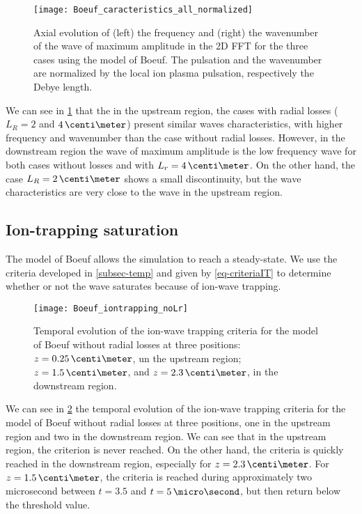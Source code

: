 \begin{figure}[hbtp]
  \centering
  \texttt{[image: Boeuf\_caracteristics\_all\_normalized]}
  \caption{Axial evolution of (left) the frequency and (right) the wavenumber of the wave of maximum amplitude in the \ac{2D} \ac{FFT} for the three cases using the model of Boeuf. The pulsation and the wavenumber are normalized by the local ion plasma pulsation, respectively the Debye length.}
  \label{fig-axial_maxwave_normalized}
\end{figure}

We can see in \cref{fig-axial_maxwave_normalized} that the in the upstream region, the cases with radial losses ($L_R=2$ and $4\,\centi\meter$) present similar waves characteristics, with higher frequency and wavenumber than the case without radial losses.
However, in the downstream region the wave of maximum amplitude is the low frequency wave for both cases without losses and with $L_r=4\,\centi\meter$.
On the other hand, the case $L_R=2\,\centi\meter$ shows a small discontinuity, but the wave characteristics are very close to the wave in the upstream region.


\subsection{Ion-trapping saturation } \label{subsec-boeuf_iontrapping}

The model of Boeuf allows the simulation to reach a steady-state.
We use the criteria developed in \cref{subsec-temp} and given by \cref{eq-criteriaIT} to determine whether or not the wave saturates because of ion-wave trapping.

\begin{figure}[hbtp]
  \centering
  \texttt{[image: Boeuf\_iontrapping\_noLr]}
  \caption{Temporal evolution of the ion-wave trapping criteria for the model of Boeuf without radial losses at three positions\string: $z=0.25\,\centi\meter$, un the upstream region; $z=1.5\,\centi\meter$, and $z=2.3\,\centi\meter$, in the downstream region.}
  \label{fig-ion-trap_temp_noLr}
\end{figure}

We can see in \cref{fig-ion-trap_temp_noLr} the temporal evolution of the ion-wave trapping criteria for the model of Boeuf without radial losses at three positions, one in the upstream region and two in the downstream region.
We can see that in the upstream region, the criterion is never reached.
On the other hand, the criteria is quickly reached in the downstream region, especially for $z=2.3\,\centi\meter$.
For $z=1.5\,\centi\meter$, the criteria is reached during approximately two microsecond between $t=3.5$ and $t=5\,\micro\second$, but then return below the threshold value.

